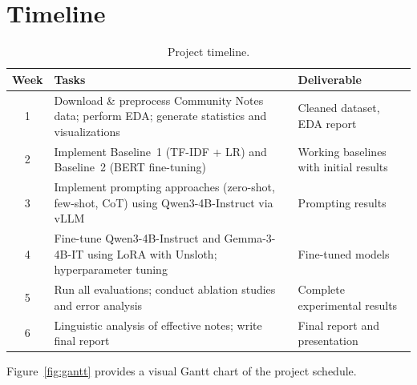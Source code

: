 \documentclass[12pt, a4paper]{article}
\begin{document}
\section{Timeline}

\begin{table}[h!]
\centering
\begin{tabularx}{\textwidth}{c X X}
\toprule
\textbf{Week} & \textbf{Tasks} & \textbf{Deliverable} \\
\midrule
1 & Download \& preprocess Community Notes data; perform EDA; generate statistics and visualizations & Cleaned dataset, EDA report \\
2 & Implement Baseline~1 (TF-IDF + LR) and Baseline~2 (BERT fine-tuning) & Working baselines with initial results \\
3 & Implement prompting approaches (zero-shot, few-shot, CoT) using Qwen3-4B-Instruct via vLLM & Prompting results \\
4 & Fine-tune Qwen3-4B-Instruct and Gemma-3-4B-IT using LoRA with Unsloth; hyperparameter tuning & Fine-tuned models \\
5 & Run all evaluations; conduct ablation studies and error analysis & Complete experimental results \\
6 & Linguistic analysis of effective notes; write final report & Final report and presentation \\
\bottomrule
\end{tabularx}
\caption{Project timeline.}
\label{tab:timeline}
\end{table}

\noindent Figure~\ref{fig:gantt} provides a visual Gantt chart of the project schedule.
\end{document}

